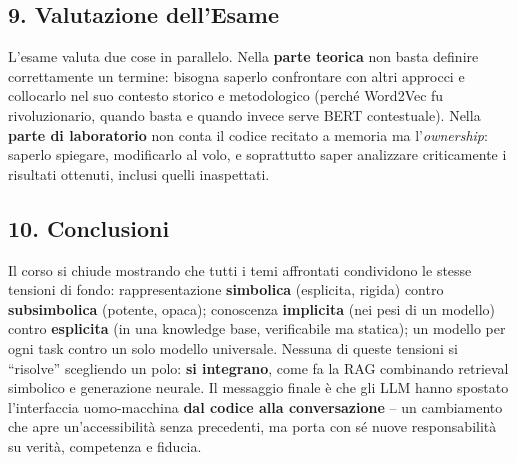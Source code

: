\documentclass[11pt,a4paper]{article}
\begin{document}
\subsection*{9. Valutazione dell'Esame}
L'esame valuta due cose in parallelo. Nella \textbf{parte teorica} non basta definire correttamente un termine: bisogna saperlo confrontare con altri approcci e collocarlo nel suo contesto storico e metodologico (perch\'e Word2Vec fu rivoluzionario, quando basta e quando invece serve BERT contestuale). Nella \textbf{parte di laboratorio} non conta il codice recitato a memoria ma l'\emph{ownership}: saperlo spiegare, modificarlo al volo, e soprattutto saper analizzare criticamente i risultati ottenuti, inclusi quelli inaspettati.

\subsection*{10. Conclusioni}
Il corso si chiude mostrando che tutti i temi affrontati condividono le stesse tensioni di fondo: rappresentazione \textbf{simbolica} (esplicita, rigida) contro \textbf{subsimbolica} (potente, opaca); conoscenza \textbf{implicita} (nei pesi di un modello) contro \textbf{esplicita} (in una knowledge base, verificabile ma statica); un modello per ogni task contro un solo modello universale. Nessuna di queste tensioni si ``risolve'' scegliendo un polo: \textbf{si integrano}, come fa la RAG combinando retrieval simbolico e generazione neurale. Il messaggio finale \`e che gli LLM hanno spostato l'interfaccia uomo-macchina \textbf{dal codice alla conversazione} -- un cambiamento che apre un'accessibilit\`a senza precedenti, ma porta con s\'e nuove responsabilit\`a su verit\`a, competenza e fiducia.
\end{document}
